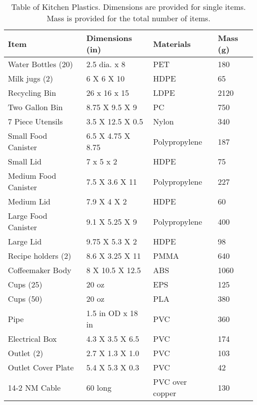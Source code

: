 \documentclass[12pt,oneside]{book}
\begin{document}
\begin{table}[!ht]
	\centering
	\caption{Table of Kitchen Plastics. Dimensions are provided for single items.  Mass is provided for the total number of items.}
	\label{tab:KitPlastics}
	\begin{tabular}{llll}
		\toprule[1.5pt]
		Item 				& Dimensions (in) 	& Materials 										& Mass (g)  \\
		\midrule
		Water Bottles (20) 	& 2.5 dia. x 8  	& PET												&  180      \\
		Milk jugs (2)     	& 6 X 6 X 10  		& HDPE											   	&   65      \\
		Recycling Bin  		& 26 x 16 x 15	    & LDPE						  						& 2120     \\
		Two Gallon Bin  	& 8.75 X 9.5 X 9	& PC 							 					&  750     \\	
		7 Piece Utensils	& 3.5 X 12.5 X 0.5	& Nylon											 	&  340   \\	
		Small Food Canister	& 6.5 X 4.75 X 8.75	& Polypropylene							  			&  187   \\
		Small Lid			& 7 x 5 x 2			& HDPE												&   75  \\
		Medium Food Canister& 7.5 X 3.6 X 11 	& Polypropylene 									&  227   \\
		Medium Lid			& 7.9 X 4 X  2		& HDPE												&   60    \\
		Large Food Canister	& 9.1 X 5.25 X 9	& Polypropylene										&  400	 \\
		Large Lid 			& 9.75 X 5.3 X 2	& HDPE 												&   98    \\
		Recipe holders (2)	& 8.6 X 3.25 X 11   & PMMA												&  640	 \\
		Coffeemaker Body	& 8 X 10.5 X 12.5	& ABS 												& 1060   \\
		Cups (25)			& 20 oz				& EPS												&  125   \\
        Cups (50)			& 20 oz				& PLA  												&  380   \\
        Pipe                & 1.5 in OD x 18 in & PVC 												&  360   \\
        Electrical Box	    & 4.3 X 3.5 X 6.5	& PVC 												&  174  \\
        Outlet (2)			& 2.7 X 1.3 X 1.0	& PVC												&  103   \\
        Outlet Cover Plate  & 5.4 X 5.3 X 0.3	& PVC  												&   42   \\
        14-2 NM Cable 		& 60 long			& PVC over copper									&  130  \\
		\bottomrule[1.25pt]
	\end{tabular}
\end{table}
\end{document}
